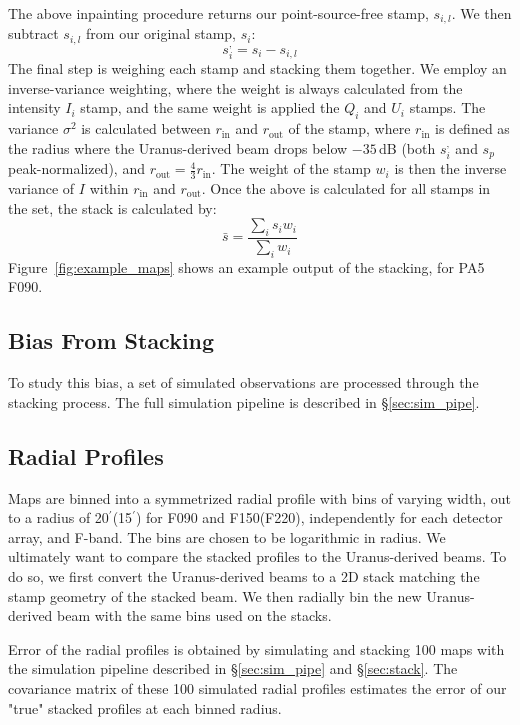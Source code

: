  The above inpainting procedure returns our point-source-free stamp, $s_{i,l}$.  We then subtract $s_{i,l}$ from our original stamp, $s_i$:
\begin{equation}
    s_i^{,} = s_i - s_{i,l}
\end{equation}
The final step is weighing each stamp and stacking them together.  We employ an inverse-variance weighting, where the weight is always calculated from the intensity $I_i$ stamp, and the same weight is applied the $Q_i$ and $U_i$ stamps.  The variance $\sigma^2$ is calculated between $r_{\text{in}}$ and $r_{\text{out}}$ of the stamp, where $r_{\text{in}}$ is defined as the radius where the Uranus-derived beam drops below $-35$\,dB (both $s_i^{,}$ and $s_p$ peak-normalized), and $r_{\text{out}}=\frac{4}{3}r_{\text{in}}$.  The weight of the stamp $w_i$ is then the inverse variance of $I$ within $r_{\text{in}}$ and $r_{\text{out}}$.  Once the above is calculated for all stamps in the set, the stack is calculated by:
\begin{equation}
    \bar{s} = \frac{\sum_i s_i w_i }{\sum_i w_i}
\end{equation}
Figure~\ref{fig:example_maps} shows an example output of the stacking, for PA5 F090.  

\subsection{Bias From Stacking}
\label{subsec:bias}
To study this bias, a set of simulated observations are processed through the stacking process.  The full simulation pipeline is described in \S\ref{sec:sim_pipe}.

\subsection{Radial Profiles}
\label{subsec:profs}
Maps are binned into a symmetrized radial profile with bins of varying width, out to a radius of 20$^{\prime}$(15$^{\prime}$) for F090 and F150(F220), independently for each detector array, and F-band.  The bins are chosen to be logarithmic in radius.  We ultimately want to compare the stacked profiles to the Uranus-derived beams.  To do so, we first convert the Uranus-derived beams to a 2D stack matching the stamp geometry of the stacked beam.  We then radially bin the new Uranus-derived beam with the same bins used on the stacks.

Error of the radial profiles is obtained by simulating and stacking 100 maps with the simulation pipeline described in \S\ref{sec:sim_pipe} and \S\ref{sec:stack}.  The covariance matrix of these 100 simulated radial profiles estimates the error of our "true" stacked profiles at each binned radius.

